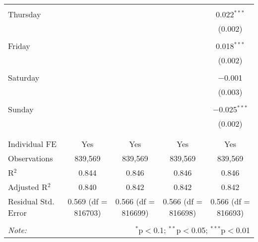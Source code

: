 \documentclass[
]{article}
\begin{document}
\begin{table}[!htbp]
{\begin{tabular}{@{\extracolsep{5pt}}lcccc}
  & & & & \\ 
 Thursday &  &  &  & 0.022$^{***}$ \\ 
  &  &  &  & (0.002) \\ 
  & & & & \\ 
 Friday &  &  &  & 0.018$^{***}$ \\ 
  &  &  &  & (0.002) \\ 
  & & & & \\ 
 Saturday &  &  &  & $-$0.001 \\ 
  &  &  &  & (0.003) \\ 
  & & & & \\ 
 Sunday &  &  &  & $-$0.025$^{***}$ \\ 
  &  &  &  & (0.002) \\ 
  & & & & \\ 
\hline \\[-1.8ex] 
Individual FE & Yes & Yes & Yes & Yes \\ 
Observations & 839,569 & 839,569 & 839,569 & 839,569 \\ 
R$^{2}$ & 0.844 & 0.846 & 0.846 & 0.846 \\ 
Adjusted R$^{2}$ & 0.840 & 0.842 & 0.842 & 0.842 \\ 
Residual Std. Error & 0.569 (df = 816703) & 0.566 (df = 816699) & 0.566 (df = 816698) & 0.566 (df = 816693) \\ 
\hline 
\hline \\[-1.8ex] 
\textit{Note:}  & \multicolumn{4}{r}{$^{*}$p$<$0.1; $^{**}$p$<$0.05; $^{***}$p$<$0.01} \\ 
\end{tabular}
} 
\end{table} 
\newpage
\end{document}
